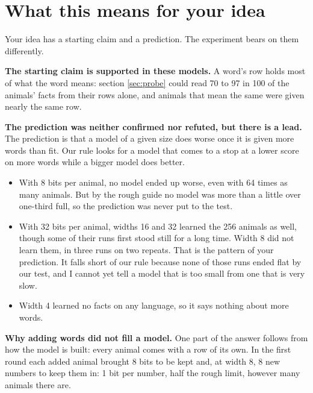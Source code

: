 \section{What this means for your idea}\label{sec:meaning}

Your idea has a starting claim and a prediction. The experiment bears on them differently.

\textbf{The starting claim is supported in these models.} A word's row holds most of what
the word means: section \ref{sec:probe} could read 70 to 97 in 100 of the animals' facts from
their rows alone, and animals that mean the same were given nearly the same row.

\textbf{The prediction was neither confirmed nor refuted, but there is a lead.} The
prediction is that a model of a given size does worse once it is given more words than fit.
Our rule looks for a model that comes to a stop at a lower score on more words while a bigger
model does better.
\begin{itemize}
\item With 8 bits per animal, no model ended up worse, even with 64 times as many animals. But
      by the rough guide no model was more than a little over one-third full, so the
      prediction was never put to the test.
\item With 32 bits per animal, widths 16 and 32 learned the 256 animals as well, though some
      of their runs first stood still for a long time. Width 8 did not learn them, in three
      runs on two repeats. That is the pattern of your prediction. It falls short of our rule
      because none of those runs ended flat by our test, and I cannot yet tell a model that is
      too small from one that is very slow.
\item Width 4 learned no facts on any language, so it says nothing about more words.
\end{itemize}

\textbf{Why adding words did not fill a model.} One part of the answer follows from how the
model is built: every animal comes with a row of its own. In the first round each added animal
brought 8 bits to be kept and, at width 8, 8 new numbers to keep them in: 1 bit per number,
half the rough limit, however many animals there are.

